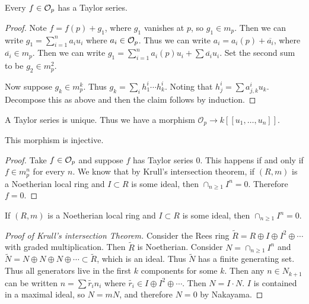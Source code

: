 \documentclass[twoside, 10pt]{article}
\begin{document}
    \begin{lem}
        Every $f \in \mathcal{O}_p$ has a Taylor series.
        \begin{proof}
            Note $f = f(p) + g_1$, where $g_1$ vanishes at $p$, so $g_1 \in m_p$. Then we can write $g_1 = \sum_{i=1}^n a_iu_i$ where $a_i \in \mathcal{O}_p$. Thus we can write $a_i = a_i(p) + \overline{a_i}$, where $\overline{a_i} \in m_p$. Then we can write $g_1 = \sum_{i=1}^n a_i(p)u_i + \sum \overline{a_i} u_i$. Set the second sum to be $g_2 \in m_p^2$.

            Now suppose $g_k \in m_p^k$. Thus $g_k = \sum_i h_1^i \cdots h_k^i$. Noting that $h_j^i = \sum a_{j,k}^i u_k$. Decompose this as above and then the claim follows by induction.
        \end{proof}
    \end{lem}

    \begin{lem}
        A Taylor series is unique. Thus we have a morphism $\mathcal{O}_p \to k[[u_1, \ldots, u_n]]$.
    \end{lem}

    \begin{lem}
        This morphism is injective.
        \begin{proof}
            Take $f \in \mathcal{O}_p$ and suppose $f$ has Taylor series $0$. This happens if and only if $f \in m_p^n$ for every $n$. We know that by Krull's intersection theorem, if $(R,m)$ is a Noetherian local ring and $I \subset R$ is some ideal, then $\cap_{n \geq 1} I^n = 0$. Therefore $f = 0$.
        \end{proof}
    \end{lem}

    \begin{thm}
        If $(R,m)$ is a Noetherian local ring and $I \subset R$ is some ideal, then $\cap_{n \geq 1} I^n = 0$.
    \end{thm}

    \begin{proof}[Proof of Krull's intersection Theorem]
        Consider the Rees ring $\widetilde{R} = R \oplus I \oplus I^2 \oplus \cdots$ with graded multiplication. Then $\widetilde{R}$ is Noetherian. Consider $N = \cap_{n\geq 1}I^n$ and $\widetilde{N} = N \oplus N \oplus N \oplus \cdots \subset \widetilde{R}$, which is an ideal. Thus $\widetilde{N}$ has a finite generating set. Thus all generators live in the first $k$ components for some $k$. Then any $n \in N_{k+1}$ can be written $n = \sum \widetilde{r_i} n_i$ where $\widetilde{r_i} \in I \oplus I^2 \oplus \cdots$. Then $N = I \cdot N$. $I$ is contained in a maximal ideal, so $N = mN$, and therefore $N=0$ by Nakayama.
    \end{proof}
\end{document}
